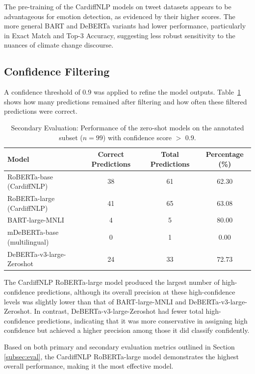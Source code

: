 The pre-training of the CardiffNLP models on tweet datasets appears to be advantageous for emotion detection, as evidenced by their higher scores. The more general BART and DeBERTa variants had lower performance, particularly in Exact Match and Top-3 Accuracy, suggesting less robust sensitivity to the nuances of climate change discourse.

\subsection{Confidence Filtering}

A confidence threshold of 0.9 was applied to refine the model outputs. Table~\ref{tab:confidence-filtering} shows how many predictions remained after filtering and how often these filtered predictions were correct.

\begin{table}[htbp]
    \centering
    \small
    \begin{tabular}{@{}lccc@{}}
        \toprule
        \textbf{Model} & \textbf{Correct Predictions} & \textbf{Total Predictions} & \textbf{Percentage (\%)} \\
        \midrule
        RoBERTa-base (CardiffNLP) & 38 & 61 & 62.30 \\
        RoBERTa-large (CardiffNLP) & 41 & 65 & 63.08 \\
        BART-large-MNLI & 4 & 5 & 80.00 \\
        mDeBERTa-base (multilingual) & 0 & 1 & 0.00 \\
        DeBERTa-v3-large-Zeroshot & 24 & 33 & 72.73 \\
        \bottomrule
    \end{tabular}
    \caption{Secondary Evaluation: Performance of the zero-shot models on the annotated subset ($n=99$) with confidence score $>$ 0.9.}
    \label{tab:confidence-filtering}
\end{table}

The CardiffNLP RoBERTa-large model produced the largest number of high-confidence predictions, although its overall precision at these high-confidence levels was slightly lower than that of BART-large-MNLI and DeBERTa-v3-large-Zeroshot. In contrast, DeBERTa-v3-large-Zeroshot had fewer total high-confidence predictions, indicating that it was more conservative in assigning high confidence but achieved a higher precision among those it did classify confidently. 
\newline

Based on both primary and secondary evaluation metrics outlined in Section \ref{subsec:eval}, the CardiffNLP RoBERTa-large model demonstrates the highest overall performance, making it the most effective model.

